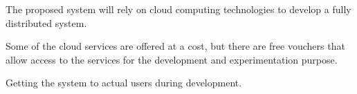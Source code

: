 The proposed system will rely on cloud computing technologies to develop a fully distributed system.

Some of the cloud services are offered at a cost, but there are free vouchers that allow access to the services for the development and experimentation purpose.

Getting the system to actual users during development.